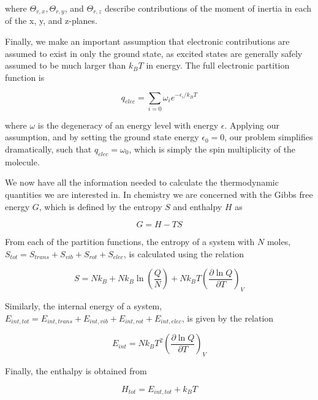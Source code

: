 \noindent where $\Theta_{r,x}, \Theta_{r,y}$, and $\Theta_{r,z}$ describe
contributions of the moment of inertia in each of the x, y, and z-planes.

Finally, we make an important assumption that electronic contributions are
assumed to exist in only the ground state, as excited states are generally
safely assumed to be much larger than $k_BT$ in energy. The full electronic
partition function is

\begin{equation}
  q_{elec} = \sum_{i=0} \omega_i e^{-\epsilon_i/k_BT}
\end{equation}

\noindent where $\omega$ is the degeneracy of an energy level with energy
$\epsilon$. Applying our assumption, and by setting the ground state energy
$\epsilon_0=0$, our problem simplifies dramatically, such that
$q_{elec} = \omega_0$, which is simply the spin multiplicity of the molecule.

We now have all the information needed to calculate the thermodynamic quantities
we are interested in. In chemistry we are concerned with the Gibbs free energy
$G$, which is defined by the entropy $S$ and enthalpy $H$ as

\begin{equation}
  G = H - TS
\end{equation}

\noindent From each of the partition functions, the entropy of a system with $N$
moles, $S_{tot} = S_{trans} + S_{vib } +S_{rot} + S_{elec}$, is calculated using
the relation

\begin{equation}
  S = Nk_B + Nk_B\ln\left( \frac{Q}{N} \right) + Nk_BT \left( \frac{\partial
      \ln Q}{\partial T} \right)_V
\end{equation}

\noindent Similarly, the internal energy of a system,
$E_{int,tot} = E_{int,trans} + E_{int,vib} + E_{int,rot} + E_{int,elec}$, is
given by the relation

\begin{equation}
  E_{int} = Nk_BT^2\left( \frac{\partial \ln Q}{\partial T} \right)_V
\end{equation}

\noindent Finally, the enthalpy is obtained from

\begin{equation}
  H_{tot} = E_{int,tot} + k_BT
\end{equation}


